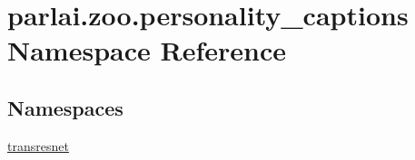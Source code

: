 \hypertarget{namespaceparlai_1_1zoo_1_1personality__captions}{}\section{parlai.\+zoo.\+personality\+\_\+captions Namespace Reference}
\label{namespaceparlai_1_1zoo_1_1personality__captions}
\subsection*{Namespaces}
\begin{DoxyCompactItemize}
\item 
 \hyperlink{namespaceparlai_1_1zoo_1_1personality__captions_1_1transresnet}{transresnet}
\end{DoxyCompactItemize}
